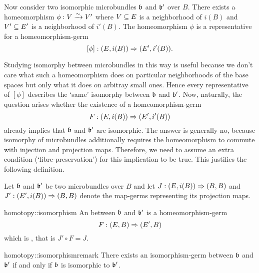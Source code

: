 \begin{myparagraph}
    Now consider two isomorphic microbundles $\mathfrak{b}$ and $\mathfrak{b}'$ over $B$.
    There exists a homeomorphism $\phi: V \xrightarrow{\sim} V'$ where
    $V \subseteq{} E$ is a neighborhood of $i(B)$ and $V' \subseteq{} E'$ is a neighborhood of $i'(B)$.
    The homeomorphism $\phi$ is a representative for a homeomorphism-germ
    \[ [\phi]: (E, i(B)) \Rightarrow{} (E', i'(B)). \]
    
    Studying isomorphy between microbundles in this way is useful because we don't care what such a
    homeomorphism does on particular neighborhoods of the base spaces but only what it does on arbitray small ones.
    Hence every representative of $[\phi]$ describes the `same' isomorphy between $\mathfrak{b}$ and $\mathfrak{b}'$.
    Now, naturally, the question arises whether the existence of a homeomorphism-germ
    \[ F: (E, i(B)) \Rightarrow{} (E', i'(B)) \]
    already implies that $\mathfrak{b}$ and $\mathfrak{b}'$ are isomorphic.
    The answer is generally no, because isomorphy of microbundles additionally requires 
    the homeomorphism to commute with injection and projection maps.
    Therefore, we need to assume an extra condition (`fibre-preservation')
    for this implication to be true.
    This justifies the following definition.
    
    Let $\mathfrak{b}$ and $\mathfrak{b}'$ be two microbundles over $B$ and
    let $J: (E, i(B)) \Rightarrow{} (B, B)$ and $J': (E', i(B)) \Rightarrow{} (B, B)$ denote the map-germs representing its projection maps.
\end{myparagraph}

\begin{mydefinition}{homotopy::isomorphism}{}
    An  between $\mathfrak{b}$ and $\mathfrak{b}'$ is a homeomorphism-germ 
    \[ F: (E, B) \Rightarrow{} (E', B) \]
    which is , that is $J' \circ F = J$.
\end{mydefinition}

\begin{myremark}{homotopy::isomorphismremark}{}
    There exists an isomorphism-germ between $\mathfrak{b}$ and $\mathfrak{b}'$ if and only if $\mathfrak{b}$ is isomorphic to $\mathfrak{b}'$.
\end{myremark}